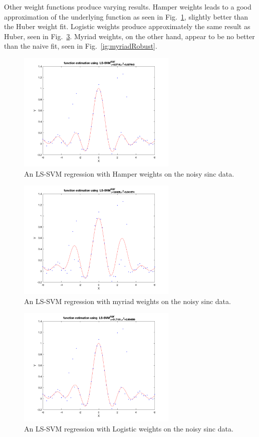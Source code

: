 \documentclass[10pt,a4paper]{article}
\begin{document}
Other weight functions produce varying results. Hamper weights leads to a good approximation of the underlying function as seen in Fig.~\ref{fig:hamperRobust}, slightly better than the Huber weight fit. Logistic weights produce approximately the same result as Huber, seen in Fig.~\ref{fig:logisticRobust}. Myriad weights, on the other hand, appear to be no better than the naive fit, seen in Fig.~\ref{ig:myriadRobust}.

\begin{figure}[h!]
\centering
  \includegraphics[width=3in]{robustHamper.png}
  \caption{An LS-SVM regression with Hamper weights on the noisy sinc data.}
  \label{fig:hamperRobust}
\end{figure}

\begin{figure}[h!]
\centering
  \includegraphics[width=3in]{robustMyriad.png}
  \caption{An LS-SVM regression with myriad weights on the noisy sinc data.}
  \label{fig:myriadRobust}
\end{figure}

\begin{figure}[h!]
\centering
  \includegraphics[width=3in]{robustLogistic.png}
  \caption{An LS-SVM regression with Logistic weights on the noisy sinc data.}
  \label{fig:logisticRobust}
\end{figure}
\end{document}
